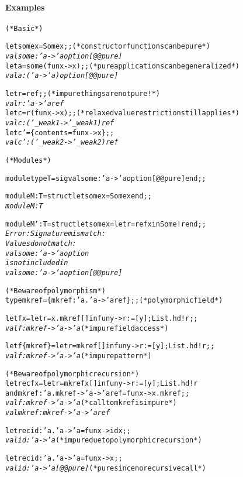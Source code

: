 \documentclass[a4paper]{article}
\let\type\textit
\newcommand\cmt[1]{\hfill{(* #1 *)}}
\begin{document}
\paragraph{Examples}
\begin{alltt}
(* Basic *)

let some x = Some x;; \cmt{constructor functions can be pure}
\type{val some : 'a -> 'a option [@@pure]}
let a = some (fun x -> x);; \cmt{pure applications can be generalized}
\type{val a : ('a -> 'a) option [@@pure]}

let r = ref;; \cmt{impure things are not pure!}
\type{val r : 'a -> 'a ref}
let c = r (fun x -> x);; \cmt{relaxed value restriction still applies}
\type{val c : ('_weak1 -> '_weak1) ref}
let c' = \{contents=fun x -> x\};;
\type{val c' : ('_weak2 -> '_weak2) ref}

(* Modules *)

module type T = sig val some : 'a -> 'a option [@@pure] end;;

module M : T = struct let some x = Some x end;;
\type{module M : T}

module M' : T = struct let some x = let r = ref x in Some !r end;;
\type{Error: Signature mismatch:
       Values do not match:
         val some : 'a -> 'a option
       is not included in
         val some : 'a -> 'a option [@@pure]}

(* Beware of polymorphism *)
type mkref = \{mkref: 'a. 'a -> 'a ref\};; \cmt{polymorphic field}

let f x = let r = x.mkref [] in fun y -> r := [y]; List.hd !r;;
\type{val f : mkref -> 'a -> 'a} \cmt{impure field access}

let f \{mkref\} = let r = mkref [] in fun y -> r := [y]; List.hd !r;;
\type{val f : mkref -> 'a -> 'a} \cmt{impure pattern}

(* Beware of polymorphic recursion *)
let rec f x = let r = mkref x [] in fun y -> r := [y]; List.hd !r
and mkref : 'a. mkref -> 'a -> 'a ref = fun x -> x.mkref;;
\type{val f : mkref -> 'a -> 'a} \cmt{call to mkref is impure}
\type{val mkref : mkref -> 'a -> 'a ref}

let rec id : 'a. 'a -> 'a = fun x -> id x;;
\type{val id : 'a -> 'a} \cmt{impure due to polymorphic recursion}

let rec id : 'a. 'a -> 'a = fun x -> x;;
\type{val id : 'a -> 'a [@@pure]} \cmt{pure since no recursive call}
\end{alltt}
\end{document}
